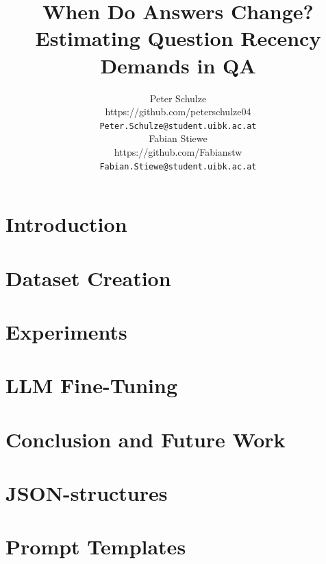 \documentclass[11pt]{article}
\title{When Do Answers Change? Estimating Question Recency Demands in QA}
\author{Peter Schulze \\
  https://github.com/peterschulze04 \\
  \texttt{Peter.Schulze@student.uibk.ac.at} \\\And
  Fabian Stiewe \\
  https://github.com/Fabianstw \\
  \texttt{Fabian.Stiewe@student.uibk.ac.at} \\
}
\begin{document}
\maketitle
\begin{abstract}

\end{abstract}

\section{Introduction}


\section{Dataset Creation}
\label{sec:dataset-creation}


\section{Experiments}
\label{sec:experiments}

\section{LLM Fine-Tuning}
\label{sec:fine_tuning}

\section{Conclusion and Future Work}
\label{sec:conclusion}


%
% 


\newpage
\appendix
\onecolumn
\section{JSON-structures}
\label{app:json-structure}


\section{Prompt Templates}
\label{app:prompts}

\end{document}
